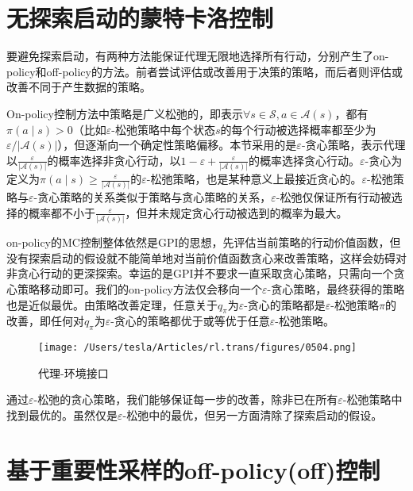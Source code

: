 \documentclass{ctexart}
\begin{document}
\section{无探索启动的蒙特卡洛控制}

要避免探索启动，有两种方法能保证代理无限地选择所有行动，分别产生了on-policy和off-policy的方法。前者尝试评估或改善用于决策的策略，而后者则评估或改善不同于产生数据的策略。

On-policy控制方法中策略是广义松弛的，即表示$\forall s \in \mathcal S, a \in \mathcal A(s)$，都有$\pi(a \mid s)>0$（比如$\varepsilon$-松弛策略中每个状态$s$的每个行动被选择概率都至少为$\varepsilon / \left\vert \mathcal A(s) \right\vert$），但逐渐向一个确定性策略偏移。本节采用的是$\varepsilon$-贪心策略，表示代理以$\frac{\varepsilon}{\left\vert \mathcal A(s) \right\vert}$的概率选择非贪心行动，以$1-\varepsilon+\frac{\varepsilon}{\left\vert \mathcal A(s) \right\vert}$的概率选择贪心行动。$\varepsilon$-贪心为定义为$\pi(a \mid s) \ge \frac{\varepsilon}{\left\vert \mathcal A(s) \right\vert}$的$\varepsilon$-松弛策略，也是某种意义上最接近贪心的。$\varepsilon$-松弛策略与$\varepsilon$-贪心策略的关系类似于策略与贪心策略的关系，$\varepsilon$-松弛仅保证所有行动被选择的概率都不小于$\frac\varepsilon{\left\vert \mathcal A(s) \right\vert}$，但并未规定贪心行动被选到的概率为最大。

on-policy的MC控制整体依然是GPI的思想，先评估当前策略的行动价值函数，但没有探索启动的假设就不能简单地对当前价值函数贪心来改善策略，这样会妨碍对非贪心行动的更深探索。幸运的是GPI并不要求一直采取贪心策略，只需向一个贪心策略移动即可。我们的on-policy方法仅会移向一个$\varepsilon$-贪心策略，最终获得的策略也是近似最优。由策略改善定理，任意关于$q_\pi$为$\varepsilon$-贪心的策略都是$\varepsilon$-松弛策略$\pi$的改善，即任何对$q_\pi$为$\varepsilon$-贪心的策略都优于或等优于任意$\varepsilon$-松弛策略。

\begin{figure}[htbp]
    \centering
    \texttt{[image: /Users/tesla/Articles/rl.trans/figures/0504.png]}
    \caption{代理-环境接口}
    \label{fig:0504} 
\end{figure}

通过$\varepsilon$-松弛的贪心策略，我们能够保证每一步的改善，除非已在所有$\varepsilon$-松弛策略中找到最优的。虽然仅是$\varepsilon$-松弛中的最优，但另一方面清除了探索启动的假设。



\section{基于重要性采样的off-policy(off)控制}
\end{document}

